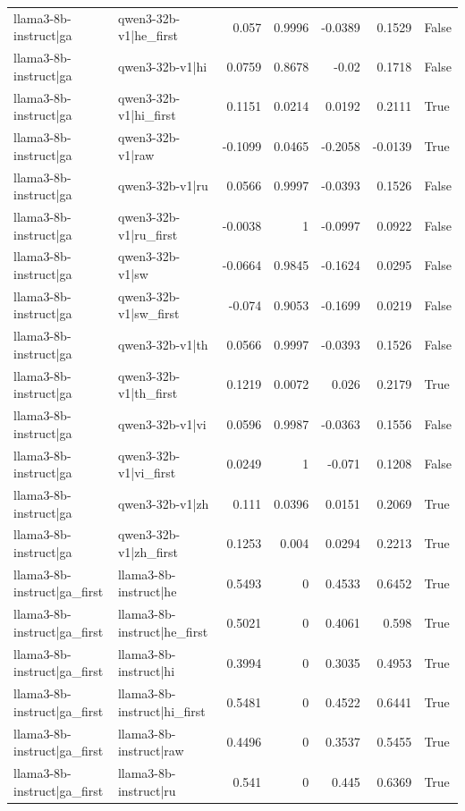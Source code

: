 \begin{table}
\begin{tabular}{l l r r r r l}
llama3-8b-instruct|ga & qwen3-32b-v1|he_first & 0.057 & 0.9996 & -0.0389 & 0.1529 & False \\
llama3-8b-instruct|ga & qwen3-32b-v1|hi & 0.0759 & 0.8678 & -0.02 & 0.1718 & False \\
llama3-8b-instruct|ga & qwen3-32b-v1|hi_first & 0.1151 & 0.0214 & 0.0192 & 0.2111 & True \\
llama3-8b-instruct|ga & qwen3-32b-v1|raw & -0.1099 & 0.0465 & -0.2058 & -0.0139 & True \\
llama3-8b-instruct|ga & qwen3-32b-v1|ru & 0.0566 & 0.9997 & -0.0393 & 0.1526 & False \\
llama3-8b-instruct|ga & qwen3-32b-v1|ru_first & -0.0038 & 1 & -0.0997 & 0.0922 & False \\
llama3-8b-instruct|ga & qwen3-32b-v1|sw & -0.0664 & 0.9845 & -0.1624 & 0.0295 & False \\
llama3-8b-instruct|ga & qwen3-32b-v1|sw_first & -0.074 & 0.9053 & -0.1699 & 0.0219 & False \\
llama3-8b-instruct|ga & qwen3-32b-v1|th & 0.0566 & 0.9997 & -0.0393 & 0.1526 & False \\
llama3-8b-instruct|ga & qwen3-32b-v1|th_first & 0.1219 & 0.0072 & 0.026 & 0.2179 & True \\
llama3-8b-instruct|ga & qwen3-32b-v1|vi & 0.0596 & 0.9987 & -0.0363 & 0.1556 & False \\
llama3-8b-instruct|ga & qwen3-32b-v1|vi_first & 0.0249 & 1 & -0.071 & 0.1208 & False \\
llama3-8b-instruct|ga & qwen3-32b-v1|zh & 0.111 & 0.0396 & 0.0151 & 0.2069 & True \\
llama3-8b-instruct|ga & qwen3-32b-v1|zh_first & 0.1253 & 0.004 & 0.0294 & 0.2213 & True \\
llama3-8b-instruct|ga_first & llama3-8b-instruct|he & 0.5493 & 0 & 0.4533 & 0.6452 & True \\
llama3-8b-instruct|ga_first & llama3-8b-instruct|he_first & 0.5021 & 0 & 0.4061 & 0.598 & True \\
llama3-8b-instruct|ga_first & llama3-8b-instruct|hi & 0.3994 & 0 & 0.3035 & 0.4953 & True \\
llama3-8b-instruct|ga_first & llama3-8b-instruct|hi_first & 0.5481 & 0 & 0.4522 & 0.6441 & True \\
llama3-8b-instruct|ga_first & llama3-8b-instruct|raw & 0.4496 & 0 & 0.3537 & 0.5455 & True \\
llama3-8b-instruct|ga_first & llama3-8b-instruct|ru & 0.541 & 0 & 0.445 & 0.6369 & True \\

\end{tabular}
\end{table}
